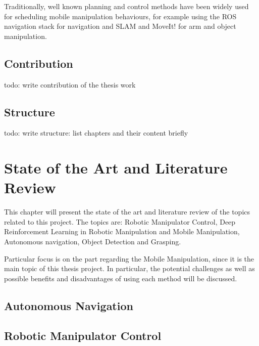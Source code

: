 Traditionally, well known planning and control methods have been widely used for scheduling
mobile manipulation behaviours, for example using the ROS navigation stack for navigation and SLAM
and MoveIt! for arm and object manipulation.

\section{Contribution}

todo: write contribution of the thesis work

\section{Structure}

todo: write structure: list chapters and their content briefly



\chapter{State of the Art and Literature Review}

This chapter will present the state of the art and literature review of the topics related to this project.
The topics are: Robotic Manipulator Control, Deep Reinforcement Learning in Robotic Manipulation and Mobile
Manipulation, Autonomous navigation, Object Detection and Grasping.

Particular focus is on the part regarding the Mobile Manipulation, since it is the main topic of this thesis
project. In particular, the potential challenges as well as possible benefits and disadvantages of using each
method will be discussed.

\section{Autonomous Navigation}

\section{Robotic Manipulator Control}

